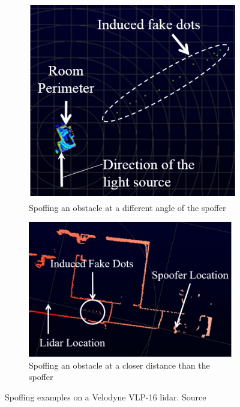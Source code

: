 \begin{figure}[H]
	\centering
	\begin{subfigure}[c]{0.4\textwidth}
	\includegraphics[width=\textwidth]{img/lidar/interference_angle_control.png}
		\caption{Spoffing an obstacle at a different angle of the spoffer}
		\label{fig:shinInterferenceAngle}
	\end{subfigure}
	\quad
	\begin{subfigure}[c]{0.55\textwidth}
		\includegraphics[width=\textwidth]{img/lidar/interference_distance_control.png}
		\caption{Spoffing an obstacle at a closer distance than the spoffer}
		\label{fig:shinInterferenceDistance}
	\end{subfigure}
	\caption{Spoffing examples on a Velodyne VLP-16 \ac{lidar}. Source~\cite{Shin2017}}
	\label{fig:shinInterference}
\end{figure}



